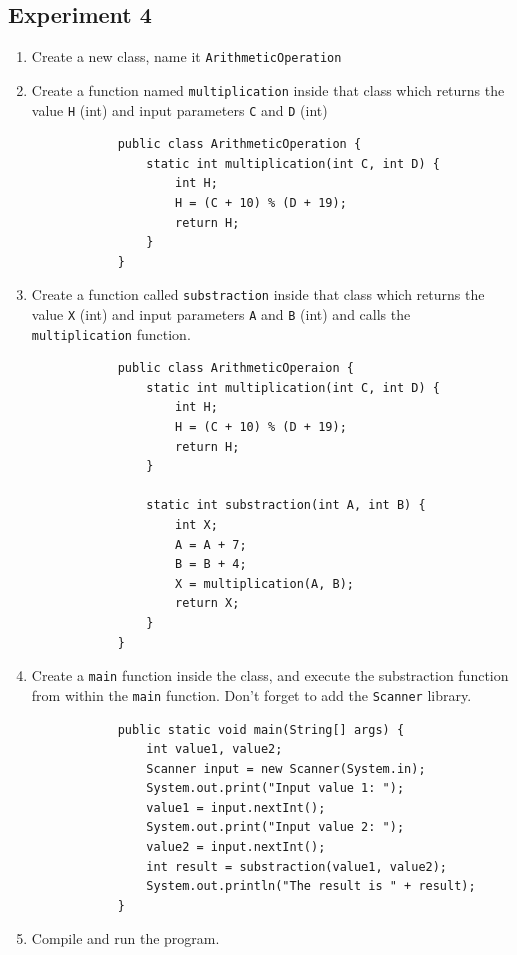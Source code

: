 \documentclass[12pt,titlepage]{article}
\begin{document}
\subsection{Experiment 4}
\begin{enumerate}
    \item Create a new class, name it \texttt{ArithmeticOperation}
    \item {
        Create a function named \texttt{multiplication} inside that class which returns the 
        value \texttt{H} (int) and input parameters \texttt{C} and \texttt{D} (int)

        \begin{verbatim}
            public class ArithmeticOperation {
                static int multiplication(int C, int D) {
                    int H;
                    H = (C + 10) % (D + 19);
                    return H;
                }
            }
        \end{verbatim}
    }
    \item {
        Create a function called \texttt{substraction} inside that class which returns the value
        \texttt{X} (int) and input parameters \texttt{A} and \texttt{B} (int) and calls the
        \texttt{multiplication} function.

        \begin{verbatim}
            public class ArithmeticOperaion {
                static int multiplication(int C, int D) {
                    int H;
                    H = (C + 10) % (D + 19);
                    return H;
                }

                static int substraction(int A, int B) {
                    int X;
                    A = A + 7;
                    B = B + 4;
                    X = multiplication(A, B);
                    return X;
                }
            }
        \end{verbatim}
    }
    \item {
        Create a \texttt{main} function inside the class, and execute the substraction function from
        within the \texttt{main} function. Don't forget to add the \texttt{Scanner} library.

        \begin{verbatim}
            public static void main(String[] args) {
                int value1, value2;
                Scanner input = new Scanner(System.in);
                System.out.print("Input value 1: ");
                value1 = input.nextInt();
                System.out.print("Input value 2: ");
                value2 = input.nextInt();
                int result = substraction(value1, value2);
                System.out.println("The result is " + result);
            }
        \end{verbatim}
    }
    \item {
        Compile and run the program.
    }
\end{enumerate}
\end{document}
